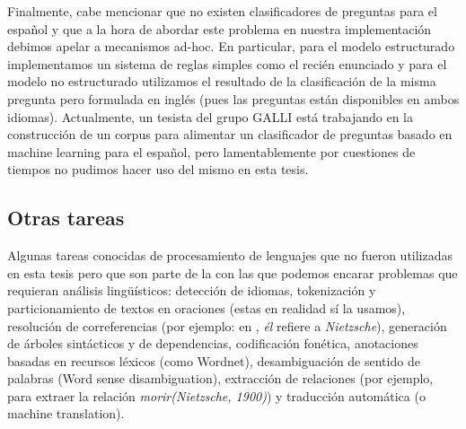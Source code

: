 Finalmente, cabe mencionar que no existen clasificadores de preguntas para el español y que a la hora de abordar este problema en nuestra implementación debimos apelar a mecanismos ad-hoc. En particular, para el modelo estructurado implementamos un sistema de reglas simples como el recién enunciado y para el modelo no estructurado utilizamos el resultado de la clasificación de la misma pregunta pero formulada en inglés (pues las preguntas están disponibles en ambos idiomas).
Actualmente, un tesista del grupo GALLI está trabajando en la construcción de un corpus para alimentar un clasificador de preguntas basado en machine learning para el español, pero lamentablemente por cuestiones de tiempos no pudimos hacer uso del mismo en esta tesis.


\subsection{Otras tareas} 

Algunas tareas conocidas de procesamiento de lenguajes que no fueron utilizadas en esta tesis pero que son parte de la  con las que podemos encarar problemas que requieran análisis lingüísticos: detección de idiomas, tokenización y particionamiento de textos en oraciones (estas en realidad sí la usamos), resolución de correferencias (por ejemplo: en , \textit{él} refiere a \textit{Nietzsche}), generación de árboles sintácticos y de dependencias, codificación fonética, anotaciones basadas en recursos léxicos (como Wordnet), desambiguación de sentido de palabras (Word sense disambiguation), extracción de relaciones (por ejemplo, para  extraer la relación \textit{morir(Nietzsche, 1900)}) y traducción automática (o machine translation). 
